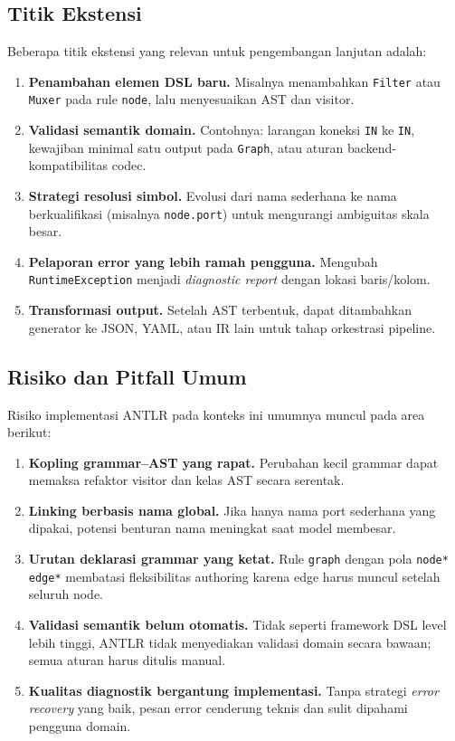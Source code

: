 \subsection{Titik Ekstensi}

Beberapa titik ekstensi yang relevan untuk pengembangan lanjutan adalah:
\begin{enumerate}
  \item \textbf{Penambahan elemen DSL baru.} Misalnya menambahkan \texttt{Filter} atau \texttt{Muxer} pada rule \texttt{node}, lalu menyesuaikan AST dan visitor.
  \item \textbf{Validasi semantik domain.} Contohnya: larangan koneksi \texttt{IN} ke \texttt{IN}, kewajiban minimal satu output pada \texttt{Graph}, atau aturan backend-kompatibilitas codec.
  \item \textbf{Strategi resolusi simbol.} Evolusi dari nama sederhana ke nama berkualifikasi (misalnya \texttt{node.port}) untuk mengurangi ambiguitas skala besar.
  \item \textbf{Pelaporan error yang lebih ramah pengguna.} Mengubah \texttt{RuntimeException} menjadi \textit{diagnostic report} dengan lokasi baris/kolom.
  \item \textbf{Transformasi output.} Setelah AST terbentuk, dapat ditambahkan generator ke JSON, YAML, atau IR lain untuk tahap orkestrasi pipeline.
\end{enumerate}

\subsection{Risiko dan Pitfall Umum}

Risiko implementasi ANTLR pada konteks ini umumnya muncul pada area berikut:
\begin{enumerate}
  \item \textbf{Kopling grammar--AST yang rapat.} Perubahan kecil grammar dapat memaksa refaktor visitor dan kelas AST secara serentak.
  \item \textbf{Linking berbasis nama global.} Jika hanya nama port sederhana yang dipakai, potensi benturan nama meningkat saat model membesar.
  \item \textbf{Urutan deklarasi grammar yang ketat.} Rule \texttt{graph} dengan pola \texttt{node* edge*} membatasi fleksibilitas authoring karena edge harus muncul setelah seluruh node.
  \item \textbf{Validasi semantik belum otomatis.} Tidak seperti framework DSL level lebih tinggi, ANTLR tidak menyediakan validasi domain secara bawaan; semua aturan harus ditulis manual.
  \item \textbf{Kualitas diagnostik bergantung implementasi.} Tanpa strategi \textit{error recovery} yang baik, pesan error cenderung teknis dan sulit dipahami pengguna domain.
\end{enumerate}

